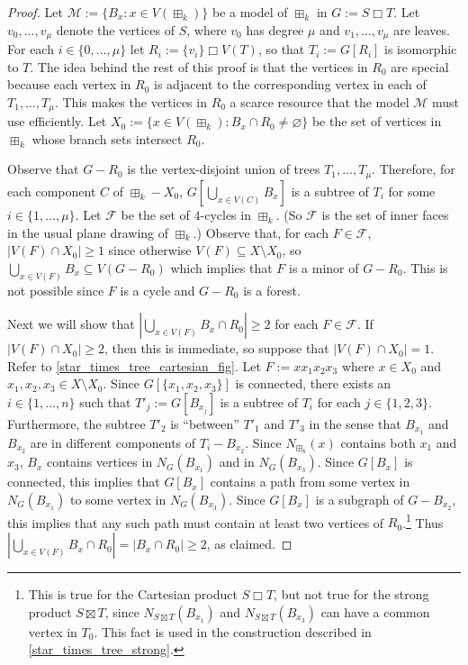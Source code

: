 \documentclass{patmorin}
\newcommand{\boxprod}{\mathbin{\Box}}
\renewcommand{\emptyset}{\varnothing}
\renewcommand{\ge}{\geqslant}
\theoremstyle{plain}
\theoremstyle{definition}
\begin{document}
\begin{proof}
  Let $\mathcal{M}:=\{B_x:x\in V(\boxplus_k)\}$ be a model of $\boxplus_k$ in $G:=S\boxprod T$.  Let $v_0,\ldots,v_\mu$ denote the vertices of $S$, where $v_0$ has degree $\mu$ and $v_1,\ldots,v_\mu$ are leaves.  For each $i\in\{0,\ldots,\mu\}$ let $R_i:=\{v_i\}\boxprod V(T)$, so that $T_i:=G[R_i]$ is isomorphic to $T$.  The idea behind the rest of this proof is that the vertices in $R_0$ are special because each vertex in $R_0$ is adjacent to the corresponding vertex in each of $T_1,\ldots,T_\mu$. This makes the vertices in $R_0$ a scarce resource that the model $\mathcal{M}$ must use efficiently.  Let $X_0:=\{x\in V(\boxplus_k):B_x\cap R_0\neq\emptyset\}$ be the set of vertices in $\boxplus_k$ whose branch sets intersect $R_0$.

  Observe that $G-R_0$ is the vertex-disjoint union of trees $T_1,\ldots,T_\mu$.  Therefore, for each component $C$ of $\boxplus_k-X_0$, $G[\bigcup_{x\in V(C)} B_x]$ is a subtree of $T_i$ for some $i\in\{1,\ldots,\mu\}$.  Let $\mathcal{F}$ be the set of $4$-cycles in $\boxplus_k$. (So $\mathcal{F}$ is the set of inner faces in the usual plane drawing of $\boxplus_k$.)  Observe that, for each $F\in\mathcal{F}$, $|V(F)\cap X_0|\ge 1$ since otherwise $V(F)\subseteq X\setminus X_0$, so $\bigcup_{x\in V(F)}B_x\subseteq V(G-R_0)$ which implies that $F$ is a minor of $G-R_0$. This is not possible since $F$ is a cycle and $G-R_0$ is a forest.  
  
  Next we will show that $|\bigcup_{x\in V(F)} B_x\cap R_0|\ge 2$ for each $F\in\mathcal{F}$.  If $|V(F)\cap X_0|\ge 2$, then this is immediate, so suppose that $|V(F)\cap X_0|=1$.  Refer to \cref{star_times_tree_cartesian_fig}.  Let $F:=xx_1x_2x_3$ where $x\in X_0$ and $x_1,x_2,x_3\in X\setminus X_0$.  Since $G[\{x_1,x_2,x_3\}]$ is connected, there exists an $i\in\{1,\ldots,n\}$ such that $T'_j:=G[B_{x_j}]$ is a subtree of $T_i$ for each $j\in\{1,2,3\}$.  Furthermore, the subtree $T'_2$ is ``between'' $T'_1$ and $T'_3$ in the sense that $B_{x_1}$ and $B_{x_2}$ are in different components of $T_i-B_{x_2}$.  Since $N_{\boxplus_k}(x)$ contains both $x_1$ and $x_3$, $B_x$ contains vertices in $N_{G}(B_{x_1})$ and in  $N_{G}(B_{x_3})$.  Since $G[B_x]$ is connected, this implies that $G[B_x]$ contains a path from some vertex in  $N_{G}(B_{x_1})$ to some vertex in $N_{G}(B_{x_3})$.  Since $G[B_x]$ is a subgraph of $G-B_{x_2}$, this implies that any such path must contain at least two vertices of $R_0$.\footnote{This is true for the Cartesian product $S\boxprod T$, but not true for the strong product $S\boxtimes T$, since $N_{S\boxtimes T}(B_{x_1})$ and $N_{S\boxtimes T}(B_{x_3})$ can have a common vertex in $T_0$. This fact is used in the construction described in \cref{star_times_tree_strong}.}  Thus $|\bigcup_{x\in V(F)}B_x\cap R_0|=|B_x\cap R_0|\ge 2$, as claimed.


\end{proof}
\end{document}
